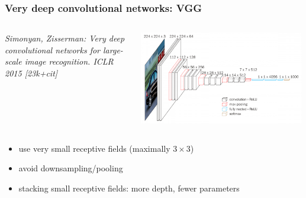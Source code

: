 \documentclass[compress]{beamer}
\newcommand{\is}[1]{\setlength{\itemsep}{#1}}
\begin{document}
\begin{frame} \frametitle{Very deep convolutional networks: VGG}
\begin{columns}
\begin{column}{0.48\textwidth}
{\small \textit{Simonyan, Zisserman: Very deep convolutional networks for large-scale image recognition. ICLR 2015 [23k+cit]}}
\end{column}
\begin{column}{0.50\textwidth}
\begin{center}
\includegraphics[width=0.99\textwidth]{./figures/vgg.png}
\end{center}
\end{column}
\end{columns}

\begin{itemize} \is{2mm}
\item use very small receptive fields (maximally $3 \times 3$)
\item avoid downsampling/pooling
\item stacking small receptive fields: more depth, fewer parameters
\end{itemize}
\end{frame}





\end{document}

